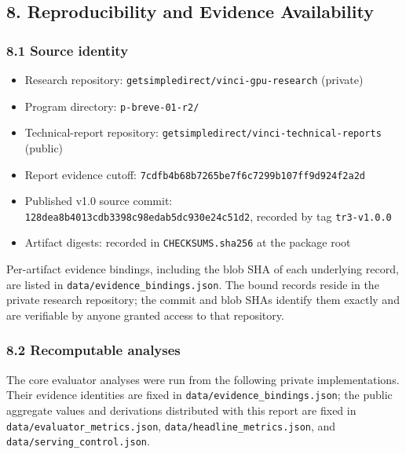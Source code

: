 \documentclass[
]{article}
\providecommand{\tightlist}{%
  \setlength{\itemsep}{0pt}\setlength{\parskip}{0pt}}
\begin{document}
\subsection{8. Reproducibility and Evidence
Availability}\label{8-reproducibility-and-evidence-availability}

\subsubsection{8.1 Source identity}\label{81-source-identity}

\begin{itemize}
\tightlist
\item
  Research repository: \texttt{getsimpledirect/vinci-gpu-research}
  (private)
\item
  Program directory: \texttt{p-breve-01-r2/}
\item
  Technical-report repository:
  \texttt{getsimpledirect/vinci-technical-reports} (public)
\item
  Report evidence cutoff:
  \texttt{7cdfb4b68b7265be7f6c7299b107ff9d924f2a2d}
\item
  Published v1.0 source commit:
  \texttt{128dea8b4013cdb3398c98edab5dc930e24c51d2}, recorded by tag
  \texttt{tr3-v1.0.0}
\item
  Artifact digests: recorded in \texttt{CHECKSUMS.sha256} at the package
  root
\end{itemize}

Per-artifact evidence bindings, including the blob SHA of each
underlying record, are listed in \texttt{data/evidence\_bindings.json}.
The bound records reside in the private research repository; the commit
and blob SHAs identify them exactly and are verifiable by anyone granted
access to that repository.

\subsubsection{8.2 Recomputable
analyses}\label{82-recomputable-analyses}

The core evaluator analyses were run from the following private
implementations. Their evidence identities are fixed in
\texttt{data/evidence\_bindings.json}; the public aggregate values and
derivations distributed with this report are fixed in
\texttt{data/evaluator\_metrics.json},
\texttt{data/headline\_metrics.json}, and
\texttt{data/serving\_control.json}.
\end{document}
